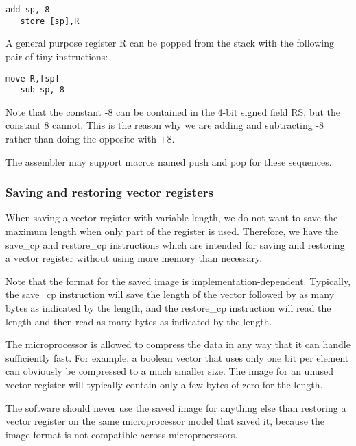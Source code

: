 \documentclass[forwardcom.tex]{subfiles}
\begin{document}
\begin{lstlisting}[frame=none]
   add sp,-8
   store [sp],R
\end{lstlisting}

A general purpose register R can be popped from the stack with the following pair of tiny instructions:

\begin{lstlisting}[frame=none]
   move R,[sp]
   sub sp,-8
\end{lstlisting}

Note that the constant -8 can be contained in the 4-bit signed field RS, but the constant 8 cannot. This is the reason why we are adding and subtracting -8 rather than doing the opposite with +8.
\vspace{2mm}

The assembler may support macros named push and pop for these sequences.

\subsubsection{Saving and restoring vector registers} \label{saveRestoreVectorRegisters}
When saving a vector register with variable length, we do not want to save the maximum length when only part of the register is used. Therefore, we have the save\_cp and restore\_cp instructions which are intended for saving and restoring a vector register without using more memory than necessary.
\vspace{2mm}

Note that the format for the saved image is implementation-dependent. Typically, the save\_cp instruction will save the length of the vector followed by as many bytes as indicated by the length, and the restore\_cp instruction will read the length and then read as many bytes as indicated by the length. 
\vspace{2mm}

The microprocessor is allowed to compress the data in any way that it can handle sufficiently fast. For example, a boolean vector that uses only one bit per element can obviously be compressed to a much smaller size. The image for an unused vector register will typically contain only a few bytes of zero for the length.
\vspace{2mm}

The software should never use the saved image for anything else than restoring a vector register on the same microprocessor model that saved it, because the image format is not compatible across microprocessors.
\vspace{2mm}
\end{document}
